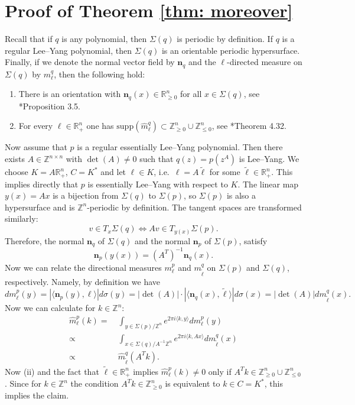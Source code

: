 \documentclass[11pt,letterpaper]{amsart}
\theoremstyle{definition}
\theoremstyle{plain}
\newcommand{\nfield}{\mathbf n}
\newcommand{\R}{{\mathbb R}}
\newcommand{\Z}{{\mathbb Z}}
\begin{document}
\section{Proof of Theorem \ref{thm: moreover}}\label{sec: moreover}
Recall that if $q$ is any polynomial, then $\Sigma(q)$ is periodic by definition. If $q$ is a regular Lee--Yang polynomial, then $\Sigma(q)$ is an orientable periodic hypersurface. Finally, if we denote the normal vector field by $\nfield_{q}$ and the $\ell$-directed measure on $\Sigma(q)$ by $m_{\ell}^{q}$, then the following hold:
\begin{enumerate}
    \item[(i)] There is an orientation with $\nfield_{q}(x)\in\R_{\ge 0}^n$ for all $x\in\Sigma(q)$, see \cite{AlonVinzant}*{Proposition 3.5}. 
    \item[(ii)] For every $\ell\in \R_{+}^n $ one has
    $\mathrm{supp}(\widehat{m}_{\ell}^{q})\subset\Z_{\ge 0}^n\cup\Z_{\le 0}^n$, see \cite{alon2025higher}*{Theorem 4.32}.
\end{enumerate}
Now assume that $p$ is a regular essentially Lee--Yang polynomial.
Then there exists $A\in\Z^{n\times n}$ with $\det(A)\neq0$ such that $q(z)=p(z^A)$ is Lee--Yang. We choose $K=A\R_+^n$, $C=K^*$ and let $\ell\in K$, i.e.~$\ell=A\tilde\ell$ for some $\tilde\ell\in\R_+^n$.
This implies directly that $p$ is essentially Lee--Yang with respect to $K$.
The linear map $y(x)=Ax$ is a bijection from $\Sigma(q)$ to $\Sigma(p)$, so $\Sigma(p)$ is also a hypersurface and is $\Z^n$-periodic by definition. The tangent spaces are transformed similarly: $$v\in T_{x}\Sigma(q)\iff Av\in T_{y(x)}\Sigma(p).$$ Therefore, the normal $\nfield_{q}$ of $\Sigma(q)$ and the normal $\nfield_{p}$ of $\Sigma(p)$, satisfy
\[\nfield_{p}(y(x))=(A^{T})^{-1}\nfield_{q}(x).\]
Now we can relate the directional measures $m^{p}_{\ell}$ and $m^{q}_{\tilde{\ell}}$ on $\Sigma(p)$ and $\Sigma(q)$, respectively. Namely, by definition we have
\begin{equation*}
    dm_\ell^p(y)=|\langle\nfield_p(y),\ell\rangle|d\sigma(y)=|\det(A)|\cdot|\langle\nfield_q(x),\tilde\ell\rangle|d\sigma(x)=|\det (A)|dm_{\tilde\ell}^q(x).
\end{equation*}
Now we can calculate for $k\in\Z^n$:
\begin{align*}
\widehat{m}_\ell^p(k)=&\ \int_{y\in\Sigma(p)/\Z^n}e^{2\pi i \langle k,y\rangle}dm^p_{\ell}(y)\\
    \propto  &\  \int_{x\in\Sigma(q)/A^{-1}\Z^n}e^{2\pi i \langle k,Ax\rangle}dm^q_{\tilde{\ell}}(x)\\
    \propto &\  \widehat{m}^q_{\tilde{\ell}}(A^Tk).
\end{align*}
Now (ii) and the fact that $\tilde{\ell}\in\R_{+}^n$ implies $\widehat{m}_\ell^p(k)\neq0$ only if $A^Tk\in\Z^n_{\ge0}\cup\Z^n_{\le 0}$. Since for $k\in\Z^n$ the condition $A^Tk\in\Z_{\geq0}^n$ is equivalent to $k\in C=K^*$, this implies the claim.
\end{document}
